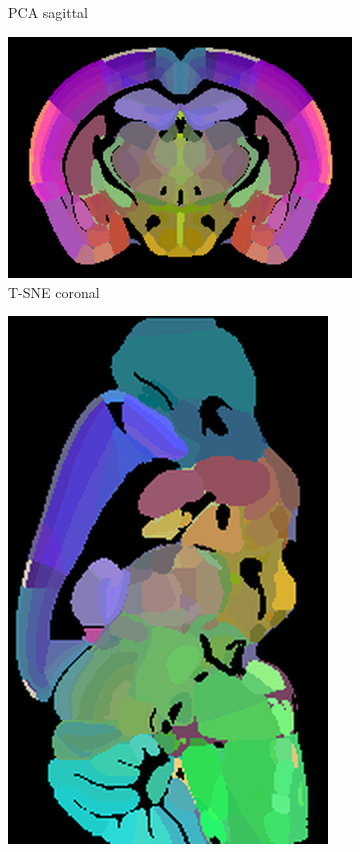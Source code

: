 \documentclass[]{article}
\begin{document}
\begin{figure}
\begin{subfigure}{.176\textwidth}
		\caption{PCA sagittal}
		\label{fig:PCA_sag}
	\end{subfigure}\hspace{1.3cm}
	\begin{subfigure}{.25\textwidth}
		\centering
		\includegraphics[width=.9\linewidth]{../results/tsne_ano_coronal_50_res_slice_1.png}
		\caption{T-SNE coronal}
		\label{fig:TSNE_cor}
	\end{subfigure}
	\begin{subfigure}{.176\textwidth}
		\centering
		\includegraphics[width=.9\linewidth, angle=270]{../results/tsne_ano_sagittal_50_res_slice_1.png}

\end{subfigure}
\end{figure}
\end{document}
